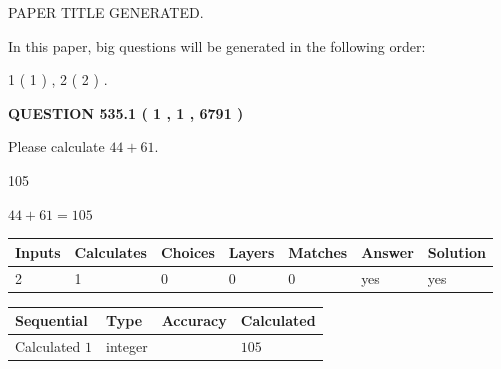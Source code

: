 \documentclass[12pt]{article}
\begin{document}
 
 
 
   
   
 PAPER TITLE GENERATED.
   
   
   
\vspace{0.2in}
   
In this paper, big questions will be generated in the following order: 
   
   
   1 ( 1 )
 ,
   2 ( 2 )
 .
  
\vspace{0.2in}
  
{\textbf{\Large{QUESTION
535.1 
 ( 1 , 1 , 6791 )
}}}
  
  
 
Please calculate $ %
44 +  %
61 $.
 
 
 
\noindent{}
 
 

105
 
 
\noindent{}
 
 

 
 
 
\noindent{}
 
 

$ %
44 +  %
61=   %
105$
 
 
\noindent{}
 
 

 
   
   
   
   
\noindent\begin{tabular}{|l|l|l|l|l|l|l|}
 \hline
Inputs & Calculates & Choices & Layers & Matches & Answer & Solution \\ \hline
 2  & 
 1  & 
 0
  & 
 0  & 
 0  & 
  yes & 
  yes 
  \\ \hline
 \end{tabular}
   
   
   
   
\noindent{}
   
   
  
  
\noindent\begin{tabular}{|l|l|l|l|}
\hline
 Sequential & Type & Accuracy & Calculated \\ 
\hline
 
 
  Calculated $  1 $ & integer &  & 
  $ 105 $ 
 \\  \hline  
 \end{tabular}
   
\end{document}
